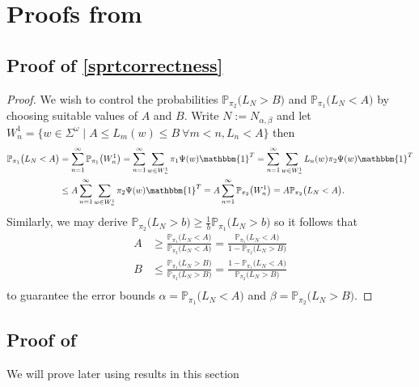 \documentclass[a4paper,UKenglish,cleveref, autoref,mathscr]{lipics-v2019}
\newcommand{\PP}{\mathbb{P}}
\newcommand{\1}{\mathbbm{1}}
\begin{document}
\section{Proofs from }

\subsection{Proof of \cref{sprtcorrectness}}

\sprtcorrectness*

\begin{proof}
We wish to control the probabilities $\PP_{\pi_2}\big( L_N > B\big)$ and $\PP_{\pi_1}\big( L_N < A\big)$ by choosing suitable values of $A$ and $B$. Write $N := N_{\alpha, \beta}$ and let $W_n^1 = \{ w \in \Sigma^\omega \mid  A \leq L_m(w) \leq B ~\forall m < n, L_n < A\}$ then
\begin{align*}
\PP_{\pi_1}\big( L_N < A \big) & = \sum_{n = 1}^\infty \PP_{\pi_1}\big( W_n^1 \big) = \sum_{n = 1}^\infty \sum_{w \in W_n^1} \pi_1 \Psi(w) \1^T = \sum_{n = 1}^\infty \sum_{w \in W_n^1} L_n(w) \pi_2 \Psi(w) \1^T \\
& \leq A \sum_{n = 1}^\infty  \sum_{w \in W_n^1} \pi_2 \Psi(w) \1^T = A \sum_{n = 1}^\infty  \PP_{\pi_2}\big( W_n^1 \big) = A \PP_{\pi_2}\big( L_N < A \big). \\
\end{align*}
Similarly, we may derive $\PP_{\pi_2}\big( L_N > b \big) \geq \frac{1}{b} \PP_{\pi_1}\big( L_N > b\big)$ so it follows that
\begin{align*}
A & \geq \frac{\PP_{\pi_1}\big(  L_N < A\big)}{\PP_{\pi_2}\big(  L_N < A\big)} = \frac{\PP_{\pi_1}\big(  L_N < A\big)}{1 - \PP_{\pi_2}\big(  L_N > B\big)} \\
B & \leq \frac{\PP_{\pi_1}\big(  L_N > B\big)}{\PP_{\pi_2}\big(  L_{N} > B\big)} = \frac{1 - \PP_{\pi_1}\big( L_N < A\big)}{\PP_{\pi_2}\big(  L_N > B\big)}\\
\end{align*}
to guarantee the error bounds $\alpha = \PP_{\pi_1}\big( L_N < A\big)$ and $\beta = \PP_{\pi_2}\big( L_N > B\big)$.
\end{proof}

\subsection{Proof of }


\asymptoticwald*

We will prove  later using results in this section
\end{document}
